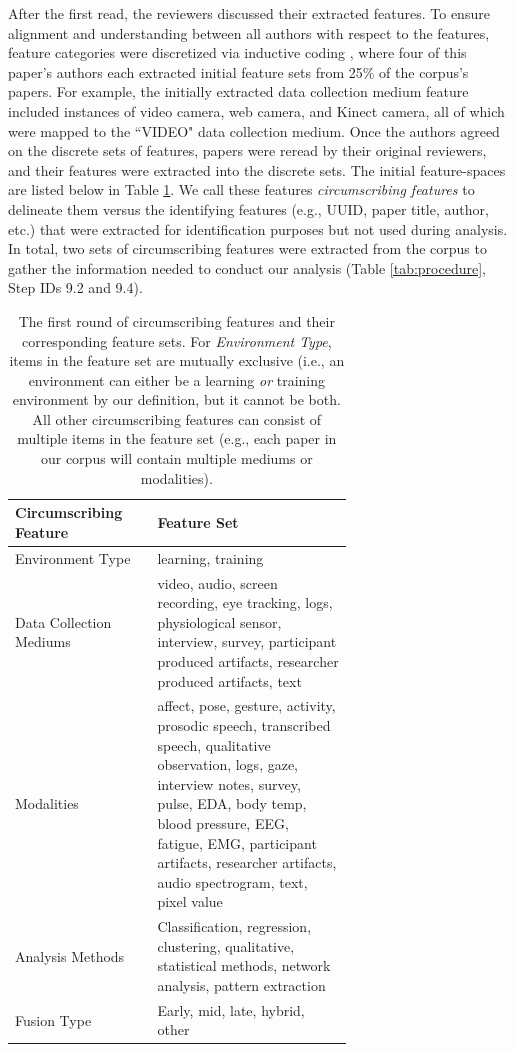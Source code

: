 \documentclass[manuscript,screen,review]{acmart}
\begin{document}
After the first read, the reviewers discussed their extracted features. To ensure alignment and understanding between all authors with respect to the features, feature categories were discretized via inductive coding \cite{thomas2003general}, where four of this paper's authors each extracted initial feature sets from 25\% of the corpus's papers. For example, the initially extracted data collection medium feature included instances of video camera, web camera, and Kinect camera, all of which were mapped to the ``VIDEO" data collection medium. Once the authors agreed on the discrete sets of features, papers were reread by their original reviewers, and their features were extracted into the discrete sets. The initial feature-spaces are listed below in Table \ref{tab:circumscribing_features_1}. We call these features \textit{circumscribing features} to delineate them versus the identifying features (e.g., UUID, paper title, author, etc.) that were extracted for identification purposes but not used during analysis. In total, two sets of circumscribing features were extracted from the corpus to gather the information needed to conduct our analysis (Table \ref{tab:procedure}, Step IDs 9.2 and 9.4).

\begin{table}[htbp]
    \renewcommand{\arraystretch}{1.3}%
    \centering
    \caption{The first round of circumscribing features and their corresponding feature sets. For \textit{Environment Type}, items in the feature set are mutually exclusive (i.e., an environment can either be a learning \textit{or} training environment by our definition, but it cannot be both. All other circumscribing features can consist of multiple items in the feature set (e.g., each paper in our corpus will contain multiple mediums or modalities).}
    \begin{tabular}{p{0.22\linewidth}@{\hskip .1in} | @{\hskip .1in}p{0.45\linewidth}@{\hskip .1in}}
        \toprule
        Circumscribing Feature & Feature Set\\
        
        \toprule
        Environment Type & learning, training\\
        Data Collection Mediums & video, audio, screen recording, eye tracking, logs, physiological sensor, interview, survey, participant produced artifacts, researcher produced artifacts, text\\
        Modalities & affect, pose, gesture, activity, prosodic speech, transcribed speech, qualitative observation, logs, gaze, interview notes, survey, pulse, EDA, body temp, blood pressure, EEG, fatigue, EMG, participant artifacts, researcher artifacts, audio spectrogram, text, pixel value\\
        Analysis Methods & Classification, regression, clustering, qualitative, statistical methods, network analysis, pattern extraction \\
        Fusion Type & Early, mid, late, hybrid, other\\

        \bottomrule
    \end{tabular}
    \label{tab:circumscribing_features_1}
\end{table}
\end{document}
